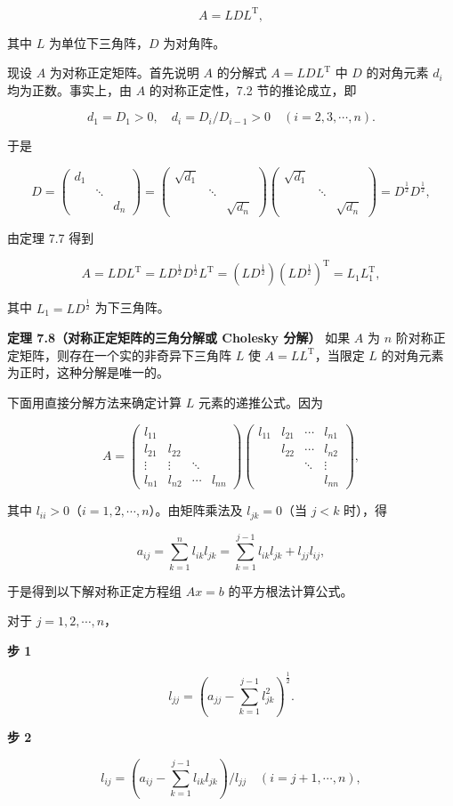 \documentclass[
  10pt,
  fontset=fandol]{ctexart}
\begin{document}
\[A=LDL^{\mathrm T},\]

其中 \(L\) 为单位下三角阵，\(D\) 为对角阵。

现设 \(A\) 为对称正定矩阵。首先说明 \(A\) 的分解式 \(A=LDL^{\mathrm T}\) 中 \(D\) 的对角元素 \(d_i\) 均为正数。事实上，由 \(A\) 的对称正定性，7.2 节的推论成立，即

\[d_1=D_1>0,\quad d_i=D_i/D_{i-1}>0\quad(i=2,3,\cdots,n).\]

于是

\[
D=\begin{pmatrix}d_1&&\\&\ddots&\\&&d_n\end{pmatrix}
=\begin{pmatrix}\sqrt{d_1}&&\\&\ddots&\\&&\sqrt{d_n}\end{pmatrix}
\begin{pmatrix}\sqrt{d_1}&&\\&\ddots&\\&&\sqrt{d_n}\end{pmatrix}
=D^{\frac12}D^{\frac12},
\]

由定理 7.7 得到

\[A=LDL^{\mathrm T}=LD^{\frac12}D^{\frac12}L^{\mathrm T}=(LD^{\frac12})(LD^{\frac12})^{\mathrm T}=L_1L_1^{\mathrm T},\]

其中 \(L_1=LD^{\frac12}\) 为下三角阵。

\textbf{定理 7.8（对称正定矩阵的三角分解或 Cholesky 分解）} 如果 \(A\) 为 \(n\) 阶对称正定矩阵，则存在一个实的非奇异下三角阵 \(L\) 使 \(A=LL^{\mathrm T}\)，当限定 \(L\) 的对角元素为正时，这种分解是唯一的。

下面用直接分解方法来确定计算 \(L\) 元素的递推公式。因为

\[
A=\begin{pmatrix}
l_{11}&&&\\
l_{21}&l_{22}&&\\
\vdots&\vdots&\ddots&\\
l_{n1}&l_{n2}&\cdots&l_{nn}
\end{pmatrix}
\begin{pmatrix}
l_{11}&l_{21}&\cdots&l_{n1}\\
&l_{22}&\cdots&l_{n2}\\
&&\ddots&\vdots\\
&&&l_{nn}
\end{pmatrix},
\]

其中 \(l_{ii}>0\)（\(i=1,2,\cdots,n\)）。由矩阵乘法及 \(l_{jk}=0\)（当 \(j<k\) 时），得

\[a_{ij}=\sum_{k=1}^{n}l_{ik}l_{jk}=\sum_{k=1}^{j-1}l_{ik}l_{jk}+l_{jj}l_{ij},\]

于是得到以下解对称正定方程组 \(Ax=b\) 的平方根法计算公式。

对于 \(j=1,2,\cdots,n\)，

\textbf{步 1}

\[l_{jj}=\left(a_{jj}-\sum_{k=1}^{j-1}l_{jk}^2\right)^{\frac12}.\tag{7.4.7}\]

\textbf{步 2}

\[l_{ij}=\left(a_{ij}-\sum_{k=1}^{j-1}l_{ik}l_{jk}\right)/l_{jj}\quad(i=j+1,\cdots,n),\]
\end{document}
